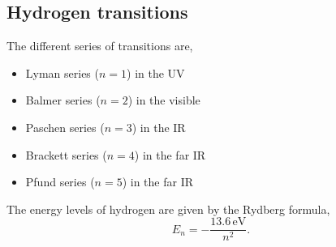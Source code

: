 \subsection{Hydrogen transitions}
The different series of transitions are, 
\begin{itemize}
  \item \textsf{Lyman series} ($n=1$) in the UV
  \item \textsf{Balmer series} ($n=2$) in the visible
  \item \textsf{Paschen series} ($n=3$) in the IR
  \item \textsf{Brackett series} ($n=4$) in the far IR
  \item \textsf{Pfund series} ($n=5$) in the far IR 
\end{itemize}
The energy levels of hydrogen are given by the Rydberg formula, 
\begin{equation}
  E_n = -\frac{13.6\,\text{eV}}{n^2}. 
\end{equation} 

